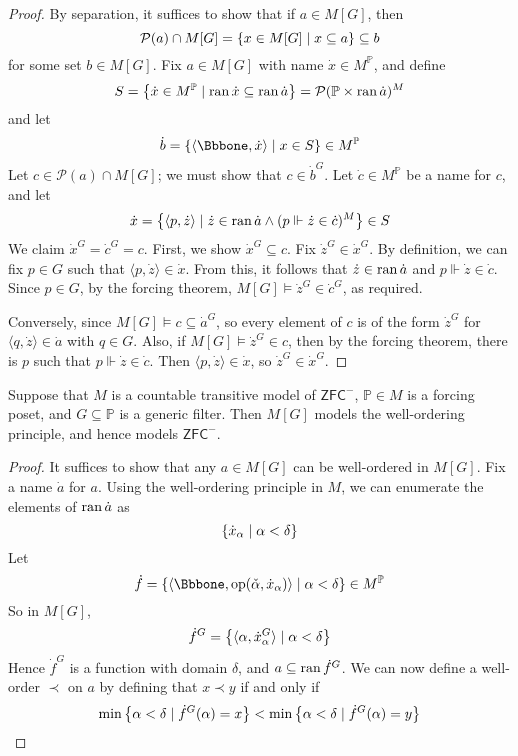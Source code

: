 \begin{proof}
    By separation, it suffices to show that if \( a \in M[G] \), then
    \[ \mathcal P(a) \cap M[G] = \qty{x \in M[G] \mid x \subseteq a} \subseteq b \]
    for some set \( b \in M[G] \).
    Fix \( a \in M[G] \) with name \( \dot x \in M^{\mathbb P} \), and define
    \[ S = \qty{\dot x \in M^{\mathbb P} \mid \operatorname{ran}\dot x \subseteq \operatorname{ran}\dot a} = \mathcal P(\mathbb P \times \operatorname{ran} \dot a)^M \]
    and let
    \[ \dot b = \qty{\langle \Bbbone, \dot x \rangle \mid x \in S} \in M^{\mathbb P} \]
    Let \( c \in \mathcal P(a) \cap M[G] \); we must show that \( c \in \dot b^G \).
    Let \( \dot c \in M^{\mathbb P} \) be a name for \( c \), and let
    \[ \dot x = \qty{\langle p, \dot z \rangle \mid \dot z \in \operatorname{ran}\dot a \wedge (p \Vdash \dot z \in \dot c)^M} \in S \]
    We claim \( \dot x^G = \dot c^G = c \).
    First, we show \( \dot x^G \subseteq c \).
    Fix \( \dot z^G \in \dot x^G \).
    By definition, we can fix \( p \in G \) such that \( \langle p, \dot z \rangle \in \dot x \).
    From this, it follows that \( \dot z \in \operatorname{ran} \dot a \) and \( p \Vdash \dot z \in \dot c \).
    Since \( p \in G \), by the forcing theorem, \( M[G] \vDash \dot z^G \in \dot c^G \), as required.

    Conversely, since \( M[G] \vDash c \subseteq \dot a^G \), so every element of \( c \) is of the form \( \dot z^G \) for \( \langle q, \dot z \rangle \in \dot a \) with \( q \in G \).
    Also, if \( M[G] \vDash \dot z^G \in c \), then by the forcing theorem, there is \( p \) such that \( p \Vdash \dot z \in \dot c \).
    Then \( \langle p, \dot z \rangle \in \dot x \), so \( \dot z^G \in \dot x^G \).
\end{proof}
\begin{lemma}
    Suppose that \( M \) is a countable transitive model of \( \mathsf{ZFC}^- \), \( \mathbb P \in M \) is a forcing poset, and \( G \subseteq \mathbb P \) is a generic filter.
    Then \( M[G] \) models the well-ordering principle, and hence models \( \mathsf{ZFC}^- \).
\end{lemma}
\begin{proof}
    It suffices to show that any \( a \in M[G] \) can be well-ordered in \( M[G] \).
    Fix a name \( \dot a \) for \( a \).
    Using the well-ordering principle in \( M \), we can enumerate the elements of \( \operatorname{ran} \dot a \) as
    \[ \qty{\dot x_\alpha \mid \alpha < \delta} \]
    Let
    \[ \dot f = \qty{\langle \Bbbone, \operatorname{op}(\check \alpha, \dot x_\alpha) \rangle \mid \alpha < \delta} \in M^{\mathbb P} \]
    So in \( M[G] \),
    \[ \dot f^G = \qty{\langle \alpha, \dot x_\alpha^G \rangle \mid \alpha < \delta} \]
    Hence \( \dot f^G \) is a function with domain \( \delta \), and \( a \subseteq \operatorname{ran} \dot f^G \).
    We can now define a well-order \( \prec \) on \( a \) by defining that \( x \prec y \) if and only if
    \[ \min\qty{\alpha < \delta \mid \dot f^G(\alpha) = x} < \min\qty{\alpha < \delta \mid \dot f^G(\alpha) = y} \]
\end{proof}
